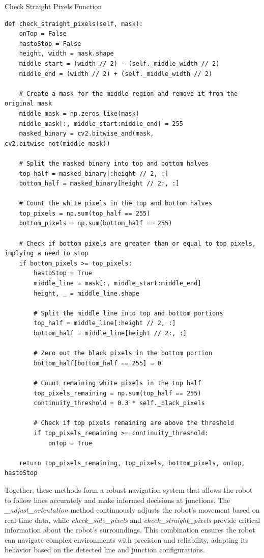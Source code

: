 \documentclass[../../main]{subfiles}
\begin{document}
\begin{codebox}[label=judeFig30]{Check Straight Pixels Function}

\begin{verbatim}
def check_straight_pixels(self, mask):
    onTop = False
    hastoStop = False
    height, width = mask.shape
    middle_start = (width // 2) - (self._middle_width // 2)
    middle_end = (width // 2) + (self._middle_width // 2)
    
    # Create a mask for the middle region and remove it from the original mask
    middle_mask = np.zeros_like(mask)
    middle_mask[:, middle_start:middle_end] = 255 
    masked_binary = cv2.bitwise_and(mask, cv2.bitwise_not(middle_mask))

    # Split the masked binary into top and bottom halves
    top_half = masked_binary[:height // 2, :]
    bottom_half = masked_binary[height // 2:, :]

    # Count the white pixels in the top and bottom halves
    top_pixels = np.sum(top_half == 255)
    bottom_pixels = np.sum(bottom_half == 255)

    # Check if bottom pixels are greater than or equal to top pixels, implying a need to stop
    if bottom_pixels >= top_pixels:
        hastoStop = True
        middle_line = mask[:, middle_start:middle_end]
        height, _ = middle_line.shape
        
        # Split the middle line into top and bottom portions
        top_half = middle_line[:height // 2, :]
        bottom_half = middle_line[height // 2:, :]

        # Zero out the black pixels in the bottom portion
        bottom_half[bottom_half == 255] = 0
        
        # Count remaining white pixels in the top half
        top_pixels_remaining = np.sum(top_half == 255)
        continuity_threshold = 0.3 * self._black_pixels
        
        # Check if top pixels remaining are above the threshold
        if top_pixels_remaining >= continuity_threshold:
            onTop = True

    return top_pixels_remaining, top_pixels, bottom_pixels, onTop, hastoStop

\end{verbatim}
\end{codebox}


Together, these methods form a robust navigation system that allows the
robot to follow lines accurately and make informed decisions at
junctions. The \emph{\_adjust\_orientation} method continuously adjusts
the robot's movement based on real-time data, while
\emph{check\_side\_pixels} and \emph{check\_straight\_pixels} provide
critical information about the robot's surroundings. This combination
ensures the robot can navigate complex environments with precision and
reliability, adapting its behavior based on the detected line and
junction configurations.
\end{document}
